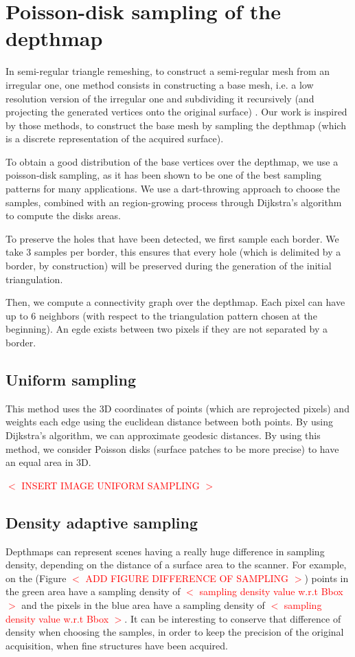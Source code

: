 \documentclass[11pt,fleqn]{book} %
\newcommand{\arnaud}[1]{\textcolor{red}{$<$ #1 $>$}}
\begin{document}
\section{Poisson-disk sampling of the depthmap}
\label{sec:poisson_sampling}

In semi-regular triangle remeshing, to construct a semi-regular mesh from an irregular one, one method consists in constructing a base mesh, i.e. a low resolution version of the irregular one and subdividing it recursively (and projecting the generated vertices onto the original surface) \cite{PRS15}. Our work is inspired by those methods, to construct the base mesh by sampling the depthmap (which is a discrete representation of the acquired surface).

To obtain a good distribution of the base vertices over the depthmap, we use a poisson-disk sampling, as it has been shown to be one of the best sampling patterns for many applications. 
We use a dart-throwing approach to choose the samples, combined with an region-growing process through Dijkstra's algorithm \cite{Dij59} to compute the disks areas.

To preserve the holes that have been detected, we first sample each border. We take 3 samples per border, this ensures that every hole (which is delimited by a border, by construction) will be preserved during the generation of the initial triangulation.

Then, we compute a connectivity graph over the depthmap. Each pixel can have up to 6 neighbors (with respect to the triangulation pattern chosen at the beginning).
An egde exists between two pixels if they are not separated by a border.

\subsection{Uniform sampling}
This method uses the 3D coordinates of points (which are reprojected pixels) and weights each edge using the euclidean distance between both points.
By using Dijkstra's algorithm, we can approximate geodesic distances. 
By using this method, we consider Poisson disks (surface patches to be more precise) to have an equal area in 3D.

\arnaud{INSERT IMAGE UNIFORM SAMPLING}

\subsection{Density adaptive sampling}
Depthmaps can represent scenes having a really huge difference in sampling density, depending on the distance of a surface area to the scanner. 
For example, on the (Figure \arnaud{ADD FIGURE DIFFERENCE OF SAMPLING}) points in the green area have a sampling density of \arnaud{sampling density value w.r.t Bbox} and the pixels in the blue area have a sampling density of \arnaud{sampling density value w.r.t Bbox}. It can be interesting to conserve that difference of density when choosing the samples, in order to keep the precision of the original acquisition, when fine structures have been acquired.
\end{document}
